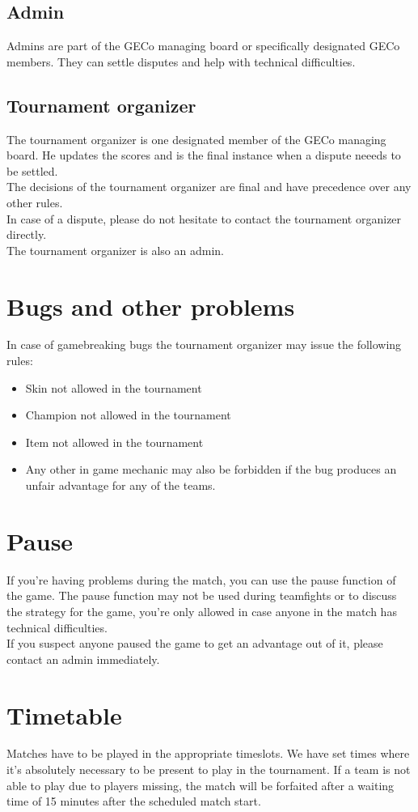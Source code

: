 \documentclass{article}
\begin{document}
\subsection{Admin}
Admins are part of the GECo managing board or specifically designated GECo members. They can settle disputes and help with technical difficulties.

\subsection{Tournament organizer}
The tournament organizer is one designated member of the GECo managing board. He updates the scores and is the final instance when a dispute neeeds to be settled.
\\
The decisions of the tournament organizer are final and have precedence over any other rules.
\\
In case of a dispute, please do not hesitate to contact the tournament organizer directly.
\\
The tournament organizer is also an admin.

\section{Bugs and other problems}
In case of gamebreaking bugs the tournament organizer may issue the following rules:
\begin{itemize}
	\item Skin not allowed in the tournament
	\item Champion not allowed in the tournament
	\item Item not allowed in the tournament
	\item Any other in game mechanic may also be forbidden if the bug produces an unfair advantage for any of the teams.
\end{itemize}

\section{Pause}
If you're having problems during the match, you can use the pause function of the game. The pause function may not be used during teamfights or to discuss the strategy for the game, you're only allowed in case anyone in the match has technical difficulties.
\\
If you suspect anyone paused the game to get an advantage out of it, please contact an admin immediately.

\section{Timetable}
Matches have to be played in the appropriate timeslots. We have set times where it's absolutely necessary to be present to play in the tournament. If a team is not able to play due to players missing, the match will be forfaited after a waiting time of 15 minutes after the scheduled match start.
\end{document}
